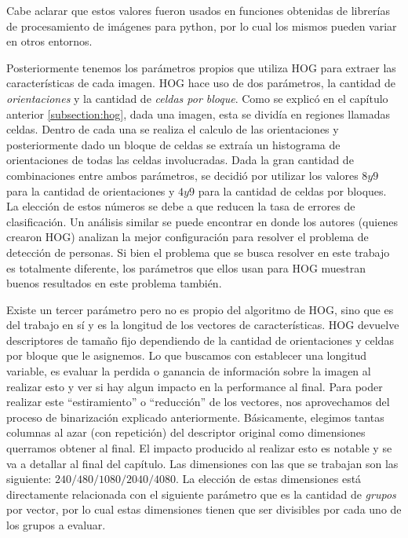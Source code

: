 	Cabe aclarar que estos valores fueron usados en funciones obtenidas de librerías de procesamiento de imágenes para python, por lo cual los mismos pueden variar en otros entornos.

	Posteriormente tenemos los parámetros propios que utiliza HOG para extraer las características de cada imagen. HOG hace uso de dos parámetros, la cantidad de \textit{orientaciones} y la cantidad de \textit{celdas por bloque}. Como se explicó en el capítulo anterior \ref{subsection:hog}, dada una imagen, esta se dividía en regiones llamadas celdas. Dentro de cada una se realiza el calculo de las orientaciones y posteriormente dado un bloque de celdas se extraía un histograma de orientaciones de todas las celdas involucradas. Dada la gran cantidad de combinaciones entre ambos parámetros, se decidió por utilizar los valores $8 y 9$ para la cantidad de orientaciones y $4 y 9$ para la cantidad de celdas por bloques. La elección de estos números se debe a que reducen la tasa de errores de clasificación. Un análisis similar se puede encontrar en \cite{DT05} donde los autores (quienes crearon HOG) analizan la mejor configuración para resolver el problema de detección de personas. Si bien el problema que se busca resolver en este trabajo es totalmente diferente, los parámetros que ellos usan para HOG muestran buenos resultados en este problema también.

	Existe un tercer parámetro pero no es propio del algoritmo de HOG, sino que es del trabajo en sí y es la longitud de los vectores de características. HOG devuelve descriptores de tamaño fijo dependiendo de la cantidad de orientaciones y celdas por bloque que le asignemos. Lo que buscamos con establecer una longitud variable, es evaluar la perdida o ganancia de información sobre la imagen al realizar esto y ver si hay algun impacto en la performance al final. Para poder realizar este ``estiramiento'' o ``reducción'' de los vectores, nos aprovechamos del proceso de binarización explicado anteriormente. Básicamente, elegimos tantas columnas al azar (con repetición) del descriptor original como dimensiones querramos obtener al final. El impacto producido al realizar esto es notable y se va a detallar al final del capítulo. Las dimensiones con las que se trabajan son las siguiente: $240/480/1080/2040/4080$. La elección de estas dimensiones está directamente relacionada con el siguiente parámetro que es la cantidad de \textit{grupos} por vector, por lo cual estas dimensiones tienen que ser divisibles por cada uno de los grupos a evaluar.

